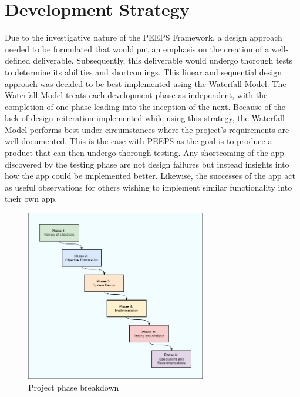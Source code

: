 \section{Development Strategy}
Due to the investigative nature of the PEEPS Framework, a design approach needed to be formulated that would put an emphasis on the creation of a well-defined deliverable. Subsequently, this deliverable would undergo thorough tests to determine its abilities and shortcomings. This linear and sequential design approach was decided to be best implemented using the Waterfall Model. The Waterfall Model treats each development phase as independent, with the completion of one phase leading into the inception of the next. Because of the lack of design reiteration implemented while using this strategy, the Waterfall Model performs best under circumstances where the project’s requirements are well documented. This is the case with PEEPS as the goal is to produce a product that can then undergo thorough testing. Any shortcoming of the app discovered by the testing phase are not design failures but instead insights into how the app could be implemented better. Likewise, the successes of the app act as useful observations for others wishing to implement similar functionality into their own app.

\begin{figure}[ht]
\centering
\includegraphics[width=0.7\textwidth]{figures/waterfall.png}
\caption{Project phase breakdown}
\label{fig:phase_breakdown}
\end{figure}


